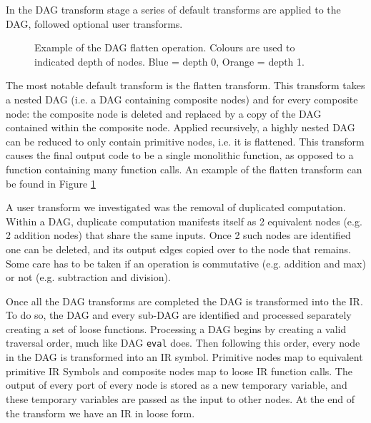 In the DAG transform stage a series of default transforms are applied to the DAG, followed optional user transforms.

\begin{figure}[h!]
    \centering
    \hspace{1em}
    \hspace{1em}
    \caption{Example of the DAG flatten operation. Colours are used to indicated depth of nodes. Blue = depth 0, Orange = depth 1.}\label{fig:flatten_example}
\end{figure}

The most notable default transform is the flatten transform.
This transform takes a nested DAG (i.e. a DAG containing composite nodes) and for every composite node: the composite node is deleted and replaced by a copy of the DAG contained within the composite node.
Applied recursively, a highly nested DAG can be reduced to only contain primitive nodes, i.e. it is flattened.
This transform causes the final output code to be a single monolithic function, as opposed to a function containing many function calls.
An example of the flatten transform can be found in Figure \ref{fig:flatten_example}

A user transform we investigated was the removal of duplicated computation.
Within a DAG, duplicate computation manifests itself as 2 equivalent nodes (e.g. 2 addition nodes) that share the same inputs.
Once 2 such nodes are identified one can be deleted, and its output edges copied over to the node that remains.
Some care has to be taken if an operation is commutative (e.g. addition and max) or not (e.g. subtraction and division).

Once all the DAG transforms are completed the DAG is transformed into the IR.
To do so, the DAG and every sub-DAG are identified and processed separately creating a set of loose functions.
Processing a DAG begins by creating a valid traversal order, much like DAG \texttt{eval} does.
Then following this order, every node in the DAG is transformed into an IR symbol.
Primitive nodes map to equivalent primitive IR Symbols and composite nodes map to loose IR function calls.
The output of every port of every node is stored as a new temporary variable, and these temporary variables are passed as the input to other nodes.
At the end of the transform we have an IR in loose form.

